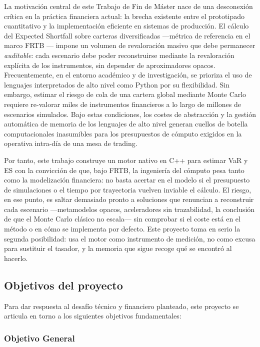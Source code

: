 \documentclass[11pt]{article}
\begin{document}
La motivación central de este Trabajo de Fin de Máster nace de una desconexión crítica en la práctica financiera actual: la brecha existente entre el prototipado cuantitativo y la implementación eficiente en sistemas de producción. El cálculo del Expected Shortfall sobre carteras diversificadas ---métrica de referencia en el marco FRTB \cite{bcbs2013frtb}--- impone un volumen de revaloración masivo que debe permanecer \emph{auditable}: cada escenario debe poder reconstruirse mediante la revaloración explícita de los instrumentos, sin depender de aproximadores opacos. Frecuentemente, en el entorno académico y de investigación, se prioriza el uso de lenguajes interpretados de alto nivel como Python por su flexibilidad. Sin embargo, estimar el riesgo de cola de una cartera global mediante Monte Carlo requiere re-valorar miles de instrumentos financieros a lo largo de millones de escenarios simulados. Bajo estas condiciones, los costes de abstracción y la gestión automática de memoria de los lenguajes de alto nivel generan cuellos de botella computacionales inasumibles para los presupuestos de cómputo exigidos en la operativa intra-día de una mesa de trading.

Por tanto, este trabajo construye un motor nativo en C++ para estimar VaR y ES con la convicción de que, bajo FRTB, la ingeniería del cómputo pesa tanto como la modelización financiera: no basta acertar en el modelo si el presupuesto de simulaciones o el tiempo por trayectoria vuelven inviable el cálculo.
El riesgo, en ese punto, es saltar demasiado pronto a soluciones que renuncian a reconstruir cada escenario ---metamodelos opacos, aceleradores sin trazabilidad, la conclusión de que el Monte Carlo clásico no escala--- sin comprobar si el coste está en el método o en cómo se implementa por defecto.
Este proyecto toma en serio la segunda posibilidad: usa el motor como instrumento de medición, no como excusa para sustituir el tasador, y la memoria que sigue recoge qué se encontró al hacerlo.

\subsection{Objetivos del proyecto}

Para dar respuesta al desafío técnico y financiero planteado, este proyecto se articula en torno a los siguientes objetivos fundamentales:

\subsubsection{Objetivo General}
\end{document}
